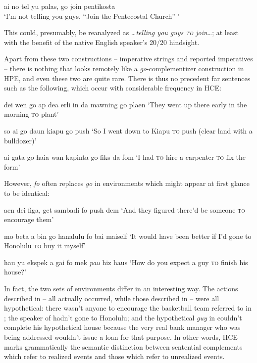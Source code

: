 \ea\label{ex:60}
 ai no tel yu palas, go join pentikosta\\
\glt `I'm not telling you guys, ``Join the Pentecostal Church'' '
\z

\noindent This could, presumably, be reanalyzed as \ldots \textit{telling you guys \textsc{to} join}\ldots; at least with the benefit of the native English speaker's 20/20 hindsight.

Apart from these two constructions -- imperative strings and reported imperatives -- there is nothing that looks remotely like a \textit{go}-complementizer construction in HPE, and even these two are quite rare. There is thus no precedent far sentences such as the following, which occur with considerable frequency in HCE:

\ea\label{ex:61}
 dei wen go ap dea erli in da mawning go plaen
\glt `They went up there early in the morning \textsc{to} plant'
\z

\ea\label{ex:62}
 so ai go daun kiapu go push
\glt `So I went down to Kiapu \textsc{to} push (clear land with a bulldozer)'
\z

\ea\label{ex:63}
 ai gata go haia wan kapinta go fiks da fom
\glt `I had \textsc{to} hire a carpenter \textsc{to} fix the form'
\z

However, \textit{fo} often replaces \textit{go} in environments which might appear at first glance to be identical:

\ea\label{ex:64}
 aen dei figa, get sambadi fo push dem
\glt `And they figured there'd be someone \textsc{to} encourage them'
\z

\ea\label{ex:65}
 mo beta a bin go hanalulu fo bai maiself
\glt `It would have been better if I'd gone to Honolulu \textsc{to} buy it myself' 
\z

\ea\label{ex:66}
 hau yu ekspek a gai fo mek \textit{pau} hiz haus
\glt `How do you expect a guy \textsc{to} finish his house?'
\z

\noindent In fact, the two sets of environments differ in an interesting way. The actions described in -- all actually occurred, while those de\-scribed in -- were all hypothetical: there wasn't anyone to encourage the basketball team referred to in ; the speaker of  hadn't gone to Honolulu; and the hypothetical \textit{guy} in  couldn't complete his hypothetical house because the very real bank manager who was being addressed wouldn't issue a loan for that purpose. In
other words, HCE marks grammatically the semantic distinction be\-tween sentential complements which refer to realized events and those which refer to unrealized events.

